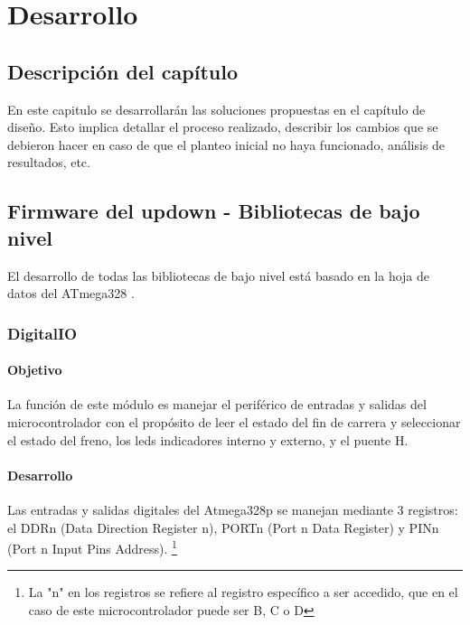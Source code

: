 \chapter{Desarrollo}
\thispagestyle{empty}

\section{Descripción del capítulo} \label{sec:\thesection}
En este capitulo se desarrollarán las soluciones propuestas en el capítulo de diseño. Esto implica detallar el proceso realizado, describir los cambios que se debieron hacer en caso de que el planteo inicial no haya funcionado, análisis de resultados, etc.

\section{Firmware del updown - Bibliotecas de bajo nivel} \label{sec:\thesection}
El desarrollo de todas las bibliotecas de bajo nivel está basado en la hoja de datos del ATmega328 \cite{sec2_6_2-2}.

\subsection{DigitalIO}
\subsubsection{Objetivo}
La función de este módulo es manejar el periférico de entradas y salidas del microcontrolador con el propósito de leer el estado del fin de carrera y seleccionar el estado del freno, los leds indicadores interno y externo, y el puente H.

\subsubsection{Desarrollo}
Las entradas y salidas digitales del Atmega328p se manejan mediante 3 registros: el DDRn (Data Direction Register n), PORTn (Port n Data Register) y PINn (Port n Input Pins Address). \footnote{La "n" en los registros se refiere al registro específico a ser accedido, que en el caso de este microcontrolador puede ser B, C o D}

